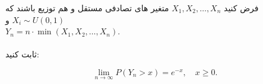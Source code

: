 \problem{}
فرض کنید \( X_1, X_2, \dots, X_n \) متغیر های تصادفی مستقل و هم توزیع باشند که \( X_i \sim U(0,1)\) و\\
\( Y_n = n \cdot \min(X_1, X_2, \dots, X_n) \). \\
\\
ثابت کنید: 

\[ \lim_{n \to \infty} P(Y_n > x) = e^{-x}, \quad x \geq 0. \]
